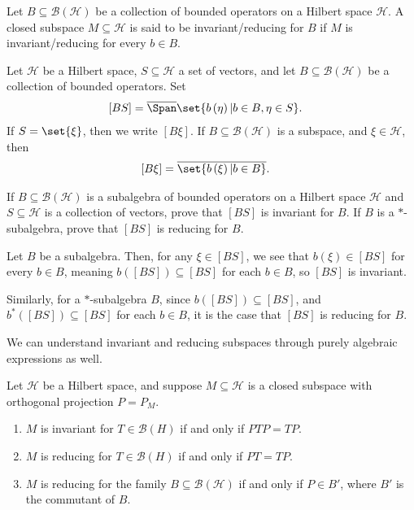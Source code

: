 \documentclass[10pt]{mypackage}
\begin{document}
\begin{definition}
  Let $B\subseteq \mathcal{B}\left(\mathcal{H}\right)$ be a collection of bounded operators on a Hilbert space $\mathcal{H}$. A closed subspace $M\subseteq \mathcal{H}$ is said to be invariant/reducing for $B$ if $M$ is invariant/reducing for every $b\in B$.
\end{definition}
\begin{definition}
  Let $\mathcal{H}$ be a Hilbert space, $S\subseteq \mathcal{H}$ a set of vectors, and let $B\subseteq \mathcal{B}\left(\mathcal{H}\right)$ be a collection of bounded operators. Set
  \begin{align*}
    \left[BS\right] &= \overline{\Span}\set{b\left(\eta\right) | b\in B,\eta \in S}.
  \end{align*}
  If $S = \set{\xi}$, then we write $\left[B\xi\right]$. If $B\subseteq \mathcal{B}\left(\mathcal{H}\right)$ is a subspace, and $\xi\in \mathcal{H}$, then
  \begin{align*}
    \left[B\xi\right] &= \overline{\set{b\left(\xi\right) | b\in B}}.
  \end{align*}
\end{definition}
\begin{exercise}
  If $B\subseteq \mathcal{B}\left(\mathcal{H}\right)$ is a subalgebra of bounded operators on a Hilbert space $\mathcal{H}$ and $S\subseteq \mathcal{H}$ is a collection of vectors, prove that $\left[BS\right]$ is invariant for $B$. If $B$ is a $\ast$-subalgebra, prove that $\left[BS\right]$ is reducing for $B$.
\end{exercise}
\begin{solution}
  Let $B$ be a subalgebra. Then, for any $\xi\in \left[BS\right]$, we see that $b\left(\xi\right)\in \left[BS\right]$ for every $b\in B$, meaning $b\left(\left[BS\right]\right)\subseteq \left[BS\right]$ for each $b\in B$, so $\left[BS\right]$ is invariant.\newline

  Similarly, for a $\ast$-subalgebra $B$, since $b\left(\left[BS\right]\right)\subseteq \left[BS\right]$, and $b^{\ast}\left(\left[BS\right]\right)\subseteq \left[BS\right]$ for each $b\in B$, it is the case that $\left[BS\right]$ is reducing for $B$.
\end{solution}
We can understand invariant and reducing subspaces through purely algebraic expressions as well.
\begin{lemma}
  Let $\mathcal{H}$ be a Hilbert space, and suppose $M\subseteq \mathcal{H}$ is a closed subspace with orthogonal projection $P = P_M$.
  \begin{enumerate}[(1)]
    \item $M$ is invariant for $T\in \mathcal{B}\left(H\right)$ if and only if $PTP = TP$.
    \item $M$ is reducing for $T\in \mathcal{B}\left(H\right)$ if and only if $PT = TP$.
    \item $M$ is reducing for the family $B\subseteq \mathcal{B}\left(\mathcal{H}\right)$ if and only if $P\in B'$, where $B'$ is the commutant of $B$.
  \end{enumerate}
\end{lemma}
\end{document}
